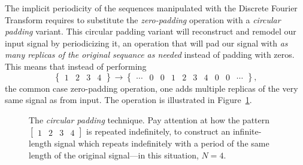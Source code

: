 \documentclass[\documentfontsize, twocolumn]{\classname}
\begin{document}
The implicit periodicity of the sequences manipulated with the Discrete Fourier Transform requires to substitute the \emph{zero-padding} operation with a \emph{circular padding} variant. This circular padding variant will reconstruct and remodel our input signal by periodicizing it, an operation that will pad our signal with \emph{as many replicas of the original sequance as needed} instead of padding with zeros. This means that instead of performing
\[
    \begin{Bmatrix} 1 & 2 & 3 & 4 \end{Bmatrix} \rightarrow \begin{Bmatrix} \cdots & 0 & 0 & 1 & 2 & 3 & 4 & 0 & 0 & \cdots\end{Bmatrix},
\]
the common case zero-padding operation,
one adds multiple replicas of the very same signal as from input. The operation is illustrated in Figure~\ref{tikz:circularZeroPadding}.

\begin{figure}[ht]
\begin{center}
    \end{center}\caption{The \emph{circular padding} technique. Pay attention at how the pattern $\begin{bmatrix} 1 & 2 & 3 & 4 \end{bmatrix}$ is repeated indefinitely, to construct an infinite-length signal which repeats indefinitely with a period of the same length of the original signal---in this situation, $N=4$.}\label{tikz:circularZeroPadding}
\end{figure}
\end{document}
